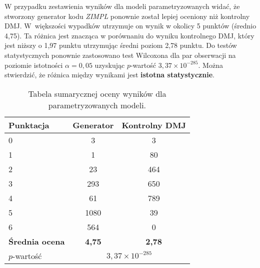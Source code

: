 W przypadku zestawienia wyników dla modeli parametryzowanych widać, że stworzony generator kodu \textit{ZIMPL} ponownie został lepiej oceniony niż kontrolny DMJ. W~większości wypadków utrzymuje on wynik w okolicy 5 punktów (średnio 4,75). Ta różnica jest znacząca w porównaniu do wyniku kontrolnego DMJ, który jest niższy o 1,97 punktu utrzymując średni poziom 2,78 punktu. Do testów statystycznych ponownie zastosowano test Wilcoxona dla par obserwacji na poziomie istotności $\alpha=0,05$ uzyskując $p$-wartość \textbf{\( 3{,}37 \times 10^{-285} \)}. %
Można stwierdzić, że różnica między wynikami jest \textbf{istotna statystycznie}.

\begin{table}[H]
\caption{Tabela sumarycznej oceny wyników dla parametryzowanych modeli.}\label{tab:tabela23}
\centering%
\begin{tabular}{|l|c|c|}
\hline
\textbf{Punktacja} & \textbf{Generator} & \textbf{Kontrolny DMJ}\\
\hline
0 & 3 & 3 \\
\hline
1 & 1 & 80 \\
\hline
2 & 23 & 464 \\
\hline
3 & 293 & 650 \\
\hline
4 & 61 & 789 \\
\hline
5 & 1080 & 39 \\
\hline
6 & 564 & 0 \\
\hline
\textbf{Średnia ocena} & \textbf{4,75} & \textbf{2,78} \\
\hline
$p$-wartość&\multicolumn{2}{|c|}{\(3{,}37 \times 10^{-285} \)} \\
\hline
\end{tabular}
\end{table}

